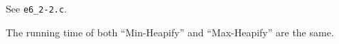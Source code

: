 See \texttt{e6\_2-2.c}.

The running time of both ``Min-Heapify'' and ``Max-Heapify'' are the same.
